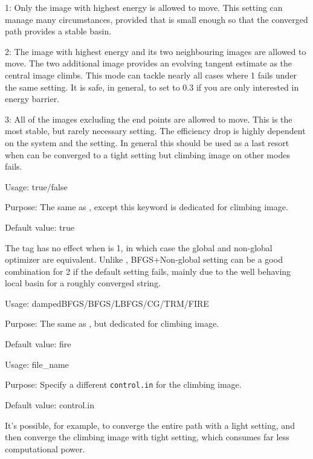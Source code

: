  1: Only the image with highest energy is allowed to move. This setting can manage many circumstances, provided that  is small enough so that the converged path provides a stable basin. 



 2: The image with highest energy and its two neighbouring  images are allowed to move. The two additional image provides an evolving tangent estimate as the central image climbs. This mode can tackle nearly all cases where  1 fails under the same  setting. It is safe, in general, to set  to 0.3 if you are only interested in energy barrier. 


 3: All of the images excluding the end points are allowed to move. This is the most stable, but rarely necessary setting. The efficiency drop is highly dependent on the system and the  setting. In general this should be used as a last resort when  can be converged to a tight setting but climbing image on other modes fails. 






{
Usage:  true/false


Purpose: The same as , except this keyword is dedicated for climbing image. 

Default value: true
}
The tag has no effect when  is 1, in which case the global and non-global optimizer are equivalent. Unlike , BFGS+Non-global setting can be a good combination for  2 if the default setting fails, mainly due to the well behaving local basin for a roughly converged string. 



{
Usage:  dampedBFGS/BFGS/LBFGS/CG/TRM/FIRE 


Purpose: The same as , but dedicated for climbing image.


Default value: fire
}


{
Usage:  file\_name


Purpose: Specify a different \texttt{control.in} for the climbing image. 

Default value: control.in
}
It's possible, for example, to converge the entire path with a light setting, and then converge the climbing image with tight setting, which consumes far less computational power. 

